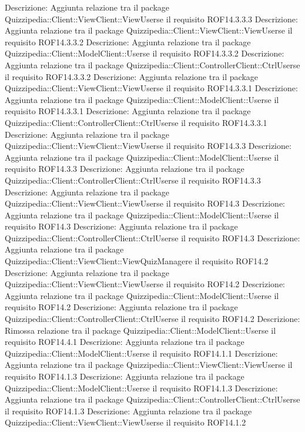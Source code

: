 Descrizione: Aggiunta relazione tra il package Quizzipedia::Client::ViewClient::ViewUserse il requisito ROF14.3.3.3 
Descrizione: Aggiunta relazione tra il package Quizzipedia::Client::ViewClient::ViewUserse il requisito ROF14.3.3.2 
Descrizione: Aggiunta relazione tra il package Quizzipedia::Client::ModelClient::Userse il requisito ROF14.3.3.2 
Descrizione: Aggiunta relazione tra il package Quizzipedia::Client::ControllerClient::CtrlUserse il requisito ROF14.3.3.2 
Descrizione: Aggiunta relazione tra il package Quizzipedia::Client::ViewClient::ViewUserse il requisito ROF14.3.3.1 
Descrizione: Aggiunta relazione tra il package Quizzipedia::Client::ModelClient::Userse il requisito ROF14.3.3.1 
Descrizione: Aggiunta relazione tra il package Quizzipedia::Client::ControllerClient::CtrlUserse il requisito ROF14.3.3.1 
Descrizione: Aggiunta relazione tra il package Quizzipedia::Client::ViewClient::ViewUserse il requisito ROF14.3.3 
Descrizione: Aggiunta relazione tra il package Quizzipedia::Client::ModelClient::Userse il requisito ROF14.3.3 
Descrizione: Aggiunta relazione tra il package Quizzipedia::Client::ControllerClient::CtrlUserse il requisito ROF14.3.3 
Descrizione: Aggiunta relazione tra il package Quizzipedia::Client::ViewClient::ViewUserse il requisito ROF14.3 
Descrizione: Aggiunta relazione tra il package Quizzipedia::Client::ModelClient::Userse il requisito ROF14.3 
Descrizione: Aggiunta relazione tra il package Quizzipedia::Client::ControllerClient::CtrlUserse il requisito ROF14.3 
Descrizione: Aggiunta relazione tra il package Quizzipedia::Client::ViewClient::ViewQuizManagere il requisito ROF14.2 
Descrizione: Aggiunta relazione tra il package Quizzipedia::Client::ViewClient::ViewUserse il requisito ROF14.2 
Descrizione: Aggiunta relazione tra il package Quizzipedia::Client::ModelClient::Userse il requisito ROF14.2 
Descrizione: Aggiunta relazione tra il package Quizzipedia::Client::ControllerClient::CtrlUserse il requisito ROF14.2 
Descrizione: Rimossa relazione tra il package Quizzipedia::Client::ModelClient::Userse il requisito ROF14.4.1 
Descrizione: Aggiunta relazione tra il package Quizzipedia::Client::ModelClient::Userse il requisito ROF14.1.1 
Descrizione: Aggiunta relazione tra il package Quizzipedia::Client::ViewClient::ViewUserse il requisito ROF14.1.3 
Descrizione: Aggiunta relazione tra il package Quizzipedia::Client::ModelClient::Userse il requisito ROF14.1.3 
Descrizione: Aggiunta relazione tra il package Quizzipedia::Client::ControllerClient::CtrlUserse il requisito ROF14.1.3 
Descrizione: Aggiunta relazione tra il package Quizzipedia::Client::ViewClient::ViewUserse il requisito ROF14.1.2 
